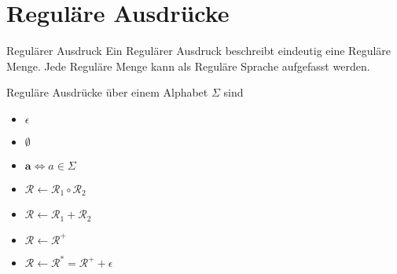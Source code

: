 \documentclass[]{beamer}
\begin{document}
\section{Reguläre Ausdrücke}
\begin{frame}[<+->][squeeze]{}
  \begin{block}{Regulärer Ausdruck}
    Ein Regulärer Ausdruck beschreibt eindeutig eine Reguläre Menge. Jede Reguläre Menge kann als Reguläre Sprache aufgefasst werden.
  \end{block}
  
  \begin{block}{Reguläre Ausdrücke über einem Alphabet $\Sigma$ sind}
    \begin{itemize}
      \item $\epsilon$
      \item $\emptyset$
      \item $\textbf{a} \Leftrightarrow a \in \Sigma$
      \item $\mathcal{R} \leftarrow \mathcal{R}_1 \circ \mathcal{R}_2$
      \item $\mathcal{R} \leftarrow \mathcal{R}_1 + \mathcal{R}_2$
      \item $\mathcal{R} \leftarrow \mathcal{R}^+$
      \item $\mathcal{R} \leftarrow \mathcal{R}^* = \mathcal{R}^+ + \epsilon$
    \end{itemize}
  \end{block}
\end{frame}
\end{document}
